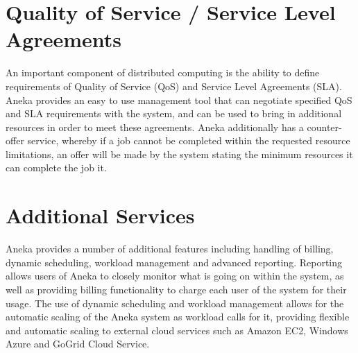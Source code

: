 \section{Quality of Service / Service Level Agreements}
An important component of distributed computing is the ability to define requirements of Quality of Service (QoS) and Service Level Agreements (SLA)\cite{CloudBus}. Aneka provides an easy to use management tool that can negotiate specified QoS and SLA requirements with the system, and can be used to bring in additional resources in order to meet these agreements. Aneka additionally has a counter-offer service, whereby if a job cannot be completed within the requested resource limitations, an offer will be made by the system stating the minimum resources it can complete the job it.

\section{Additional Services}
Aneka provides a number of additional features including handling of billing, dynamic scheduling, workload management and advanced reporting. Reporting allows users of Aneka to closely monitor what is going on within the system, as well as providing billing functionality to charge each user of the system for their usage. The use of dynamic scheduling and workload management allows for the automatic scaling of the Aneka system as workload calls for it, providing flexible and automatic scaling to external cloud services such as Amazon EC2, Windows Azure and GoGrid Cloud Service.
